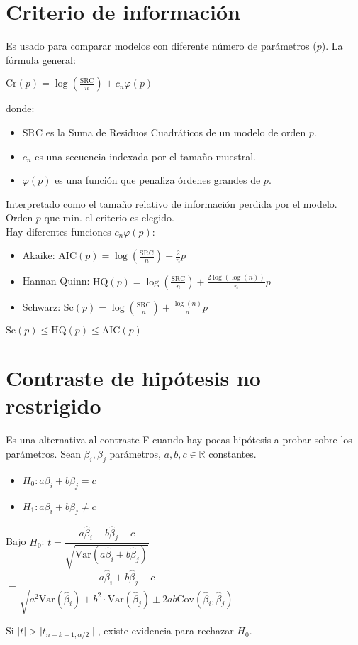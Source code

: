 \documentclass[10pt, a4paper, landscape]{extarticle}
\newcommand{\Var}{\mathrm{Var}}
\newcommand{\Cov}{\mathrm{Cov}}
\newcommand{\SRC}{\mathrm{SRC}}
\begin{document}
\begin{multicols}{3}
\section*{Criterio de información}
	Es usado para comparar modelos con diferente número de parámetros ($p$). La fórmula general:
	\begin{center}
		$\mathrm{Cr}(p) = \log(\frac{\SRC}{n}) + c_n \varphi (p)$
	\end{center}
	donde:
	\begin{itemize}[leftmargin=*]
		\item $\SRC$ es la Suma de Residuos Cuadráticos de un modelo de orden $p$.
		\item $c_n$ es una secuencia indexada por el tamaño muestral.
		\item $\varphi(p)$ es una función que penaliza órdenes grandes de $p$.
	\end{itemize}
	Interpretado como el tamaño relativo de información perdida por el modelo. Orden $p$ que min. el criterio es elegido. \\
	Hay diferentes funciones $c_n \varphi(p)$:
	\begin{itemize}[leftmargin=*]
		\item Akaike: $\mathrm{AIC}(p) = \log(\frac{\SRC}{n}) + \frac{2}{n} p$
		\item Hannan-Quinn: $\mathrm{HQ}(p) = \log(\frac{\SRC}{n}) + \frac{2 \log(\log(n))}{n} p$
		\item Schwarz: $\mathrm{Sc}(p) = \log(\frac{\SRC}{n}) + \frac{\log(n)}{n} p$
	\end{itemize}
	$\mathrm{Sc}(p) \leq \mathrm{HQ}(p) \leq \mathrm{AIC}(p)$

\section*{Contraste de hipótesis no restrigido}
	Es una alternativa al contraste F cuando hay pocas hipótesis a probar sobre los parámetros. Sean $\beta_i, \beta_j$ parámetros, $a, b, c \in \mathbb{R}$ constantes.
	\begin{itemize}[leftmargin=*]
		\item $H_0: a \beta_i + b \beta_j = c$
		\item $H_1: a \beta_i + b \beta_j \neq c$
	\end{itemize}
	\begin{center}
		Bajo $H_0$: \quad
		$t = \dfrac{a \hat{\beta}_i + b \hat{\beta}_j - c}{\sqrt{\Var(a \hat{\beta}_i + b \hat{\beta}_j)}}$
		$= \dfrac{a \hat{\beta}_i + b \hat{\beta}_j - c}{\sqrt{a^2 \Var(\hat{\beta}_i) + b^2 \cdot \Var(\hat{\beta}_j) \pm 2 a b \Cov(\hat{\beta}_i, \hat{\beta}_j)}}$
	\end{center}
	Si $\mid t \mid > \mid t_{n-k-1, \alpha/2} \mid$, existe evidencia para rechazar $H_0$.


\end{multicols}
\end{document}
